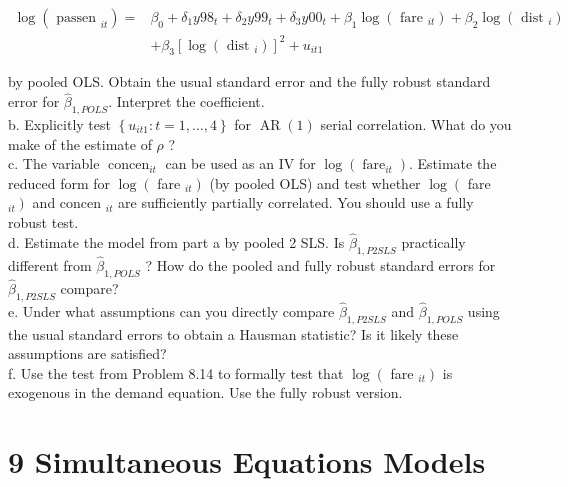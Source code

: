 \documentclass[10pt]{article}
\begin{document}
$$
\begin{aligned}
\log \left(\text { passen }_{i t}\right)= & \beta_{0}+\delta_{1} y 98_{t}+\delta_{2} y 99_{t}+\delta_{3} y 00_{t}+\beta_{1} \log \left(\text { fare }_{i t}\right)+\beta_{2} \log \left(\text { dist }_{i}\right) \\
& +\beta_{3}\left[\log \left(\text { dist }_{i}\right)\right]^{2}+u_{i t 1}
\end{aligned}
$$

by pooled OLS. Obtain the usual standard error and the fully robust standard error for $\hat{\beta}_{1, P O L S}$. Interpret the coefficient.\\
b. Explicitly test $\left\{u_{i t 1}: t=1, \ldots, 4\right\}$ for $\operatorname{AR}(1)$ serial correlation. What do you make of the estimate of $\rho$ ?\\
c. The variable $\operatorname{concen}_{i t}$ can be used as an IV for $\log \left(\operatorname{fare}_{i t}\right)$. Estimate the reduced form for $\log \left(\right.$ fare $\left._{i t}\right)$ (by pooled OLS) and test whether $\log \left(\right.$ fare $\left._{i t}\right)$ and concen $_{i t}$ are sufficiently partially correlated. You should use a fully robust test.\\
d. Estimate the model from part a by pooled 2 SLS. Is $\hat{\beta}_{1, P 2 S L S}$ practically different from $\hat{\beta}_{1, P O L S}$ ? How do the pooled and fully robust standard errors for $\hat{\beta}_{1, P 2 S L S}$ compare?\\
e. Under what assumptions can you directly compare $\hat{\beta}_{1, P 2 S L S}$ and $\hat{\beta}_{1, P O L S}$ using the usual standard errors to obtain a Hausman statistic? Is it likely these assumptions are satisfied?\\
f. Use the test from Problem 8.14 to formally test that $\log \left(\right.$ fare $\left._{i t}\right)$ is exogenous in the demand equation. Use the fully robust version.

\section*{9 Simultaneous Equations Models}
\end{document}
